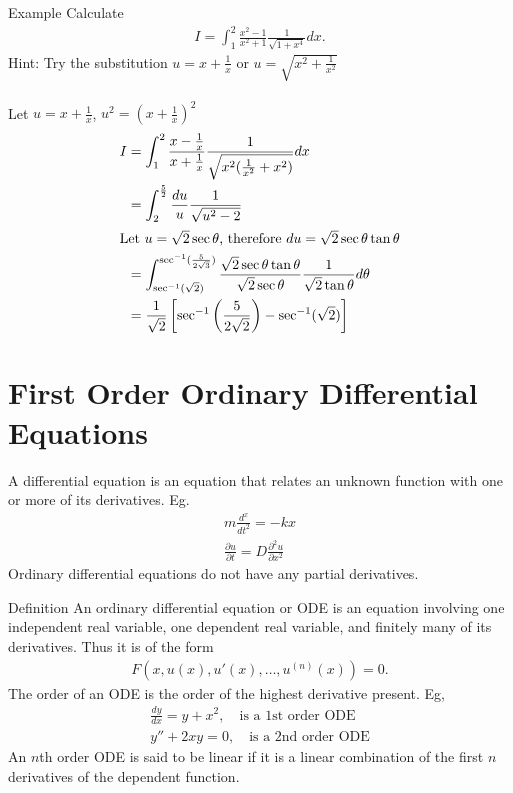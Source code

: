 \documentclass{report}
\renewcommand{\arcsec}{\operatorname{sec}^{-1}}
\begin{document}
		\begin{question}{Example}
			Calculate
			\begin{align*}
				I = \int_1^2 \frac{x^2 - 1}{x^2 + 1} \frac{1}{\sqrt{1 + x^4}} dx.
			\end{align*}
			Hint: Try the substitution $u = x + \frac{1}{x}$ or $u = \sqrt{x^2 + \frac{1}{x^2}}$
			\\ \\
			Let $u = x + \frac{1}{x}$, $u^2 = (x + \frac{1}{x})^2$
			\begin{align*}
				I &= \int_1^2 \frac{x - \frac{1}{x}}{x + \frac{1}{x}} \frac{1}{\sqrt{x^2(\frac{1}{x^2} + x^2)}} dx	\\
				  &= \int_2^\frac{5}{2} \frac{du}{u} \frac{1}{\sqrt{u^2 - 2}}	\\
				\intertext{Let $u = \sqrt{2} \sec \theta$, therefore $du = \sqrt{2} \sec \theta \tan \theta$}
				  &= \int_{\arcsec(\sqrt{2})}^{\arcsec(\frac{5}{2\sqrt{3}})} \frac{\sqrt{2} \sec \theta \tan \theta}{\sqrt{2} \sec \theta} \frac{1}{\sqrt{2} \tan \theta} d\theta	\\
				  &= \frac{1}{\sqrt{2}} \left[\arcsec\left(\frac{5}{2\sqrt{2}}\right) - \arcsec(\sqrt{2})\right]
			\end{align*}
		\end{question}

\chapter{First Order Ordinary Differential Equations}

	A differential equation is an equation that relates an unknown function with one or more of its derivatives. Eg.
		\begin{align*}
			m \frac{d^x}{dt^2} = -kx	\\
			\frac{\partial u}{\partial t} = D \frac{\partial^2 u}{\partial x^2}
		\end{align*}
	Ordinary differential equations do not have any partial derivatives.

	\begin{question}{Definition}
		An ordinary differential equation or ODE is an equation involving one independent real variable, one dependent real variable, and finitely many of its derivatives. Thus it is of the form
		\begin{align*}
			F(x,u(x), u'(x), \dots, u^{(n)}(x)) = 0.
		\end{align*}
		The order of an ODE is the order of the highest derivative present. Eg,
		\begin{align*}
			\frac{dy}{dx} = y + x^2, \quad \text{is a 1st order ODE}	\\
			y'' + 2xy = 0, \quad \text{is a 2nd order ODE}
		\end{align*}
		An $n$th order ODE is said to be linear if it is a linear combination of the first $n$ derivatives of the dependent function.
	\end{question}
\end{document}
